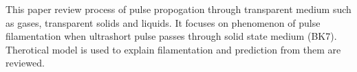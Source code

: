 \documentclass[../main.tex]{subfiles}
\begin{document}
	This paper review process of pulse propogation through transparent medium
	such as gases, transparent solids and liquids. It focuses on phenomenon
	of pulse filamentation when ultrashort pulse passes through solid state
	medium (BK7).
	Therotical model is used to explain filamentation and prediction from
	them are reviewed.
\end{document}
